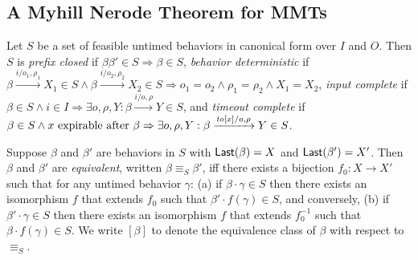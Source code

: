 \subsection{A Myhill Nerode Theorem for MMTs}

\begin{definition}
Let $S$ be a set of feasible untimed behaviors in canonical form over $I$ and $O$. Then $S$ is
\emph{prefix closed} if $\beta \beta' \in S \Rightarrow \beta \in S$,
\emph{behavior deterministic} if
$\beta \xrightarrow{i/o_1, \rho_1} X_1 \in S \wedge \beta \xrightarrow{i/o_2, \rho_2} X_2 \in S \Rightarrow o_1 = o_2 \wedge \rho_1 = \rho_2 \wedge X_1 = X_2$,
\emph{input complete} if
$\beta \in S \wedge i \in I \Rightarrow \exists o, \rho, Y : \beta \xrightarrow{i/o, \rho} Y \in S$,
and
\emph{timeout complete} if
$\beta \in S \wedge x \mbox{ expirable after } \beta \Rightarrow
\exists o, \rho, Y: \beta \xrightarrow{\mathit{to}[x]/o, \rho} Y \in S$.

Suppose $\beta$ and $\beta'$ are behaviors in $S$ with $\mathsf{Last}({\beta}) = X$ and $\mathsf{Last}({\beta'}) = X'$.
Then $\beta$ and $\beta'$ are \emph{equivalent}, written $\beta \equiv_S \beta'$, iff there exists a bijection
$f_0 : X \to X'$ such that for any untimed behavior $\gamma$:
(a) if $\beta \cdot \gamma \in S$ then there exists an isomorphism $f$ that extends $f_0$ such that $\beta' \cdot f(\gamma) \in S$, and conversely,
(b) if $\beta' \cdot \gamma \in S$ then there exists an isomorphism $f$ that extends $f_0^{-1}$ such that $\beta \cdot f(\gamma) \in S$.
We write $[\beta]$ to denote the equivalence class of $\beta$ with respect to $\equiv_S$.
\end{definition}


